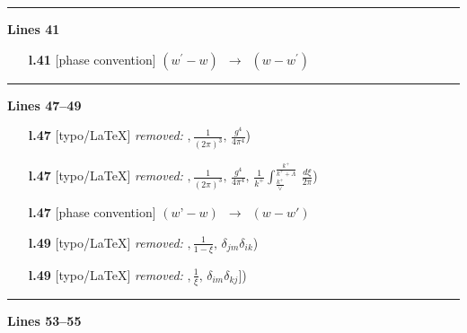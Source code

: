 \documentclass[10pt]{article}
\begin{document}
\noindent\rule{\linewidth}{0.3pt}\par\noindent\textbf{Lines 41} \par
\begin{itemize}[leftmargin=2.2em,itemsep=1pt,topsep=2pt]
\item[\textbf{l.41}] \textsf{\small [phase convention]} $\displaystyle (w^{\prime}-w)$\ $\longrightarrow$\ $\displaystyle (w-w^{\prime})$
\end{itemize}
\noindent\rule{\linewidth}{0.3pt}\par\noindent\textbf{Lines 47--49} \par
\begin{itemize}[leftmargin=2.2em,itemsep=1pt,topsep=2pt]
\item[\textbf{l.47}] \textsf{\small [typo/LaTeX]} \emph{removed:} $\displaystyle ,$$\displaystyle \frac{1}{(2\pi)^{3}},\,\frac{g^{4}}{4\pi^{4}}${\color{gray}\small)}
\item[\textbf{l.47}] \textsf{\small [typo/LaTeX]} \emph{removed:} $\displaystyle ,$$\displaystyle \frac{1}{(2\pi)^{3}},\,\frac{g^{4}}{4\pi^{4}},\,\frac{1}{k^{+}}\int_{\frac{k^{+}}{\vee}}^{\frac{k^{+}}{k^{+}+\Lambda}}\,\frac{d\xi}{2\pi}${\color{gray}\small)}
\item[\textbf{l.47}] \textsf{\small [phase convention]} $\displaystyle (w’-w)$\ $\longrightarrow$\ $\displaystyle (w-w')$
\item[\textbf{l.49}] \textsf{\small [typo/LaTeX]} \emph{removed:} $\displaystyle ,$$\displaystyle \frac{1}{1-\xi},\,\delta_{jm}\delta_{ik}${\color{gray}\small)}
\item[\textbf{l.49}] \textsf{\small [typo/LaTeX]} \emph{removed:} $\displaystyle ,$$\displaystyle \frac{1}{\xi},\,\delta_{im}\delta_{kj}\Big]${\color{gray}\small)}
\end{itemize}
\noindent\rule{\linewidth}{0.3pt}\par\noindent\textbf{Lines 53--55} \par
\end{document}
